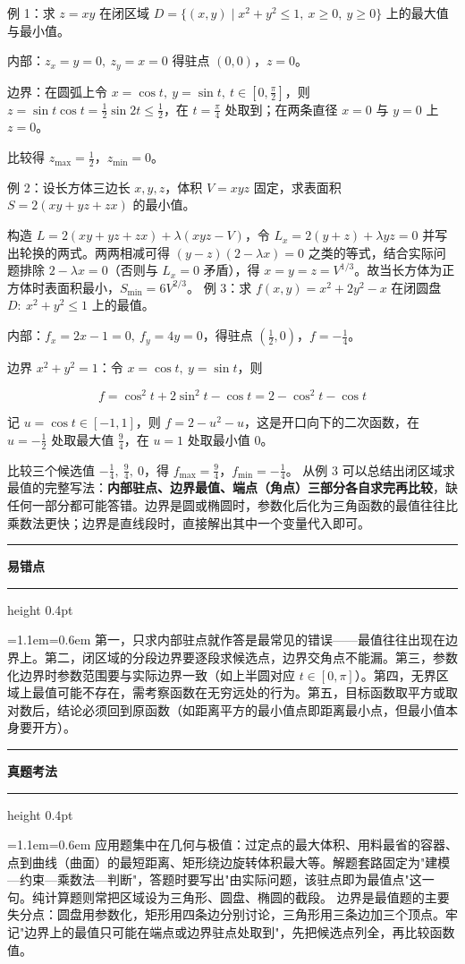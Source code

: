 \documentclass[11pt,openany,UTF8]{ctexbook}
\newcommand{\callouthead}[2]{%
  \par\addvspace{7pt}\noindent
  {\color{#1}\rule[-0.15em]{3pt}{1.05em}}\hspace{0.5em}%
  {\bfseries\color{#1}#2}\par\nobreak\vspace{-0.35em}%
  {\color{rulesep}\hrule height 0.4pt}\nobreak\vspace{0.45em}%
  \begingroup\small\setlength{\parindent}{0pt}%
  \leftskip=1.1em\rightskip=0.6em\noindent\ignorespaces}
\newcommand{\calloutend}{\par\endgroup\addvspace{7pt}}
\newenvironment{callwarn}[1]{\callouthead{warnbar}{#1}}{\calloutend}
\newenvironment{callexam}[1]{\callouthead{exambar}{#1}}{\calloutend}
\begin{document}
例 1：求 $z=xy$ 在闭区域 $D=\{(x,y)\mid x^{2}+y^{2}\le 1,\ x\ge 0,\ y\ge 0\}$ 上的最大值与最小值。

内部：$z_x=y=0,\ z_y=x=0$ 得驻点 $(0,0)$，$z=0$。

边界：在圆弧上令 $x=\cos t,\ y=\sin t,\ t\in[0,\frac{\pi}{2}]$，则 $z=\sin t\cos t=\frac12\sin 2t\le \frac12$，在 $t=\frac{\pi}{4}$ 处取到；在两条直径 $x=0$ 与 $y=0$ 上 $z=0$。

比较得 $z_{\max}=\frac12$，$z_{\min}=0$。

例 2：设长方体三边长 $x,y,z$，体积 $V=xyz$ 固定，求表面积 $S=2(xy+yz+zx)$ 的最小值。

构造 $L=2(xy+yz+zx)+\lambda(xyz-V)$，令 $L_x=2(y+z)+\lambda yz=0$ 并写出轮换的两式。两两相减可得 $(y-z)(2-\lambda x)=0$ 之类的等式，结合实际问题排除 $2-\lambda x=0$（否则与 $L_x=0$ 矛盾），得 $x=y=z=V^{1/3}$。故当长方体为正方体时表面积最小，$S_{\min}=6V^{2/3}$。 例 3：求 $f(x,y)=x^{2}+2y^{2}-x$ 在闭圆盘 $D:\ x^{2}+y^{2}\le 1$ 上的最值。

内部：$f_x=2x-1=0,\ f_y=4y=0$，得驻点 $\left(\frac12,0\right)$，$f=-\frac14$。

边界 $x^{2}+y^{2}=1$：令 $x=\cos t,\ y=\sin t$，则

\[f=\cos^{2}t+2\sin^{2}t-\cos t=2-\cos^{2}t-\cos t\]

记 $u=\cos t\in[-1,1]$，则 $f=2-u^{2}-u$，这是开口向下的二次函数，在 $u=-\frac12$ 处取最大值 $\frac94$，在 $u=1$ 处取最小值 $0$。

比较三个候选值 $-\frac14,\ \frac94,\ 0$，得 $f_{\max}=\frac94$，$f_{\min}=-\frac14$。 从例 3 可以总结出闭区域求最值的完整写法：\textbf{内部驻点、边界最值、端点（角点）三部分各自求完再比较}，缺任何一部分都可能答错。边界是圆或椭圆时，参数化后化为三角函数的最值往往比乘数法更快；边界是直线段时，直接解出其中一个变量代入即可。

\begin{callwarn}{易错点}
第一，只求内部驻点就作答是最常见的错误——最值往往出现在边界上。第二，闭区域的分段边界要逐段求候选点，边界交角点不能漏。第三，参数化边界时参数范围要与实际边界一致（如上半圆对应 $t\in[0,\pi]$）。第四，无界区域上最值可能不存在，需考察函数在无穷远处的行为。第五，目标函数取平方或取对数后，结论必须回到原函数（如距离平方的最小值点即距离最小点，但最小值本身要开方）。

\end{callwarn}

\begin{callexam}{真题考法}
应用题集中在几何与极值：过定点的最大体积、用料最省的容器、点到曲线（曲面）的最短距离、矩形绕边旋转体积最大等。解题套路固定为"建模—约束—乘数法—判断"，答题时要写出"由实际问题，该驻点即为最值点"这一句。纯计算题则常把区域设为三角形、圆盘、椭圆的截段。 边界是最值题的主要失分点：圆盘用参数化，矩形用四条边分别讨论，三角形用三条边加三个顶点。牢记"边界上的最值只可能在端点或边界驻点处取到"，先把候选点列全，再比较函数值。

\end{callexam}
\end{document}

